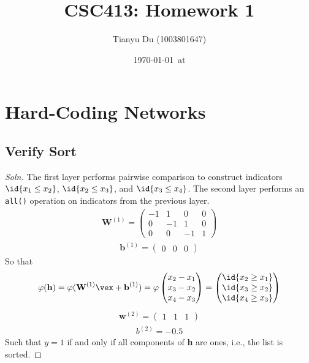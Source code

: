 \documentclass{article}
\title{CSC413: Homework 1}
\date{\today\ at \currenttime}
\author{Tianyu Du (1003801647)}
\begin{document}
    \maketitle
    \section{Hard-Coding Networks}
    \subsection{Verify Sort}
    \begin{proof}[Soln]
    	The first layer performs pairwise comparison to construct indicators $\id{x_1 \leq x_2}$, $\id{x_2 \leq x_3}$, and $\id{x_3 \leq x_4}$. The second layer performs an \texttt{all()} operation on indicators from the previous layer.
    	\begin{align}
    		\textbf{W}^{(1)} = 
    		\begin{pmatrix}
    			-1 & 1 & 0 & 0 \\
    			0 & -1 & 1 & 0 \\
    			0 & 0 & -1 & 1
    		\end{pmatrix}
    	\end{align}
    	\begin{align}
    		\textbf{b}^{(1)} = 
    		\begin{pmatrix}
    			0 & 0 & 0
    		\end{pmatrix}
    	\end{align}
    	So that 
    	\begin{align}
    		\varphi(\textbf{h}) = \varphi(\textbf{W}^{(1)} \vex + \textbf{b}^{(1)}) =
    		\varphi \begin{pmatrix}
    			x_2 - x_1 \\
    			x_3 - x_2 \\
    			x_4 - x_3
    		\end{pmatrix} =
    		\begin{pmatrix}
    			\id{x_2 \geq x_1} \\
    			\id{x_3 \geq x_2} \\
    			\id{x_4 \geq x_3}
    		\end{pmatrix}
    	\end{align}
    	\begin{align}
    		\textbf{w}^{(2)} = 
    		\begin{pmatrix}
    			1 & 1 & 1
    		\end{pmatrix}
    	\end{align}
    	\begin{align}
    		b^{(2)} = - 0.5
    	\end{align}
    	Such that $y = 1$ if and only if all components of \textbf{h} are ones, i.e., the list is sorted.
    \end{proof}
\end{document}
